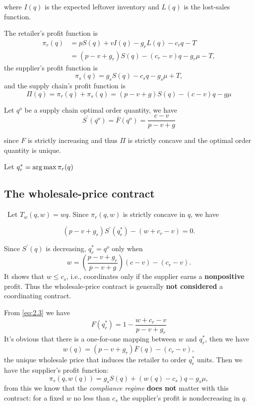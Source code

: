 where $I(q)$ is the expected leftover inventory and $L(q)$ is the lost-sales function.

The retailer's profit function is 
\begin{equation}\label{eq:retailer}\tag{Retailer}
    \begin{aligned}
        \pi_r(q)&=pS(q)+v I(q)-g_r L(q)-c_r q - T\\
    &=(p-v+g_r)S(q)-(c_r-v)q-g_r\mu-T,
    \end{aligned}
\end{equation}
the supplier's profit function is 
\begin{equation}\label{eq:supplier}\tag{Supplier}
    \pi_s(q)=g_s S(q)-c_s q-g_s\mu + T,
\end{equation}
and the supply chain's profit function is 
\begin{equation}\label{eq:2.1}
    \Pi(q)=\pi_r(q)+\pi_s(q)=(p-v+g)S(q)-(c-v)q-g\mu
\end{equation}

Let $q^o$ be a supply chain optimal order quantity, we have 
\begin{equation}\label{eq:2.2}
    S^\prime(q^o)=\overline F(q^o)=\frac{c-v}{p-v+g}
\end{equation}

since $F$ is strictly increasing and thus $\Pi$ is strictly concave and the optimal order quantity is unique.

Let $q_r^*=\operatorname*{arg\,max} \pi_r(q)$

\subsection{The wholesale-price contract}\
Let $T_w(q,w)=w q$. Since $\pi_r(q,w)$ is strictly concave in $q$, we have 

\begin{equation}\label{eq:2.3}
    (p-v+g_r)S^\prime(q_r^*)-(w+c_r-v)=0.
\end{equation}

Since $S^\prime(q)$ is decreasing, $q_r^*=q^o$ only when
$$
w=(\frac{p-v+g_r}{p-v+g})(c-v)-(c_r-v).
$$
It shows that $w\leq c_s$, i.e., coordinates only if the supplier earns a \textbf{nonpositive} profit. Thus the wholesale-price contract is generally \textbf{not considered} a coordinating contract.

From \autoref{eq:2.3} we have 
$$F(q_r^*)=1-\frac{w+c_r-v}{p-v+g_r}$$
It's obvious that there is a one-for-one mapping between $w$ and $q_r^*$, then we have $$w(q)=(p-v+g_r)\overline{F}(q)-(c_r-v),$$
the unique wholesale price that induces the retailer to order $q_r^*$ units.
Then we have the supplier's profit function:
\begin{equation}
    \pi_s(q,w(q))=g_s S(q)+(w(q)-c_s)q-g_s\mu\label{eq:2.4},
\end{equation}
from this we know that the \textit{compliance regime} \textbf{does not} matter with this contract: for a fixed $w$ no less than $c_s$ the supplier's profit  is nondecreasing in $q$.

